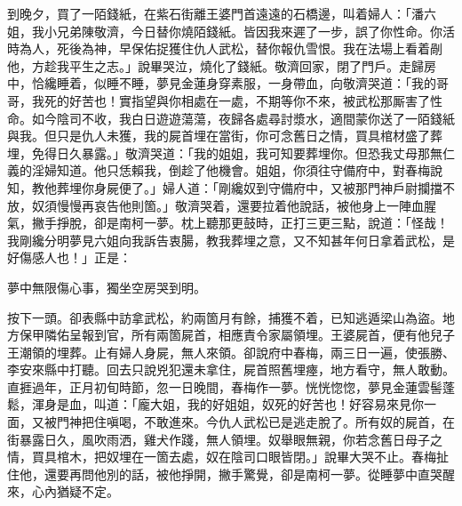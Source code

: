 到晚夕，買了一陌錢紙，在紫石街離王婆門首遠遠的石橋邊，叫着婦人：「潘六姐，我小兄弟陳敬濟，今日替你燒陌錢紙。皆因我來遲了一步，誤了你性命。你活時為人，死後為神，早保佑捉獲住仇人武松，替你報仇雪恨。我在法場上看着剮他，方趁我平生之志。」說畢哭泣，燒化了錢紙。敬濟回家，閉了門戶。走歸房中，恰纔睡着，似睡不睡，夢見金蓮身穿素服，一身帶血，向敬濟哭道：「我的哥哥，我死的好苦也！實指望與你相處在一處，不期等你不來，被武松那厮害了性命。如今陰司不收，我白日遊遊蕩蕩，夜歸各處尋討漿水，適間蒙你送了一陌錢紙與我。但只是仇人未獲，我的屍首埋在當街，你可念舊日之情，買具棺材盛了葬埋，免得日久暴露。」敬濟哭道：「我的姐姐，我可知要葬埋你。但恐我丈母那無仁義的淫婦知道。他只恁賴我，倒趁了他機會。姐姐，你須往守備府中，對春梅說知，教他葬埋你身屍便了。」婦人道：「剛纔奴到守備府中，又被那門神戶尉攔擋不放，奴須慢慢再哀告他則箇。」敬濟哭着，還要拉着他說話，被他身上一陣血腥氣，撇手掙脫，卻是南柯一夢。枕上聽那更鼓時，正打三更三點，說道：「怪哉！我剛纔分明夢見六姐向我訴告衷腸，教我葬埋之意，又不知甚年何日拿着武松，是好傷感人也！」正是：

\begin{myquote}
夢中無限傷心事，獨坐空房哭到明。
\end{myquote}

按下一頭。卻表縣中訪拿武松，約兩箇月有餘，捕獲不着，已知逃遁梁山為盜。地方保甲隣佑呈報到官，所有兩箇屍首，相應責令家屬領埋。王婆屍首，便有他兒子王潮領的埋葬。止有婦人身屍，無人來領。卻說府中春梅，兩三日一遍，使張勝、李安來縣中打聽。回去只說兇犯還未拿住，屍首照舊埋瘞，地方看守，無人敢動。直捱過年，正月初旬時節，忽一日晚間，春梅作一夢。恍恍惚惚，夢見金蓮雲髻蓬鬆，渾身是血，叫道：「龐大姐，我的好姐姐，奴死的好苦也！好容易來見你一面，又被門神把住嗔喝，不敢進來。今仇人武松已是逃走脫了。所有奴的屍首，在街暴露日久，風吹雨洒，雞犬作踐，無人領埋。奴舉眼無親，你若念舊日母子之情，買具棺木，把奴埋在一箇去處，奴在陰司口眼皆閉。」{}說畢大哭不止。春梅扯住他，還要再問他別的話，被他掙開，撇手驚覺，卻是南柯一夢。從睡夢中直哭醒來，心內猶疑不定。

